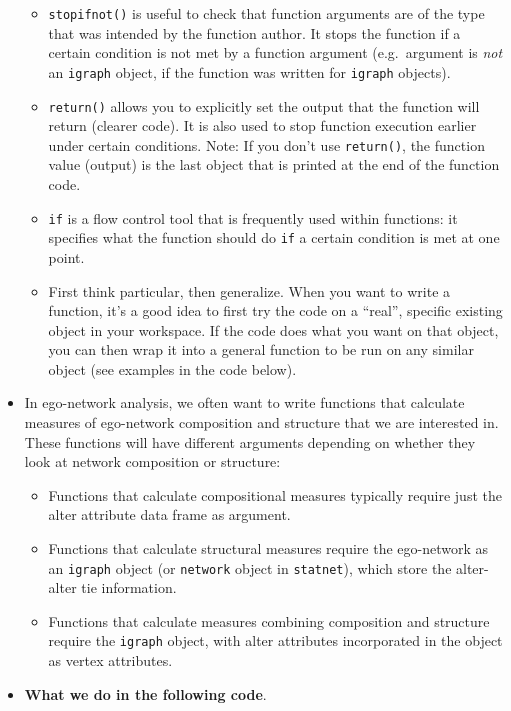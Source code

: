 \documentclass[
]{book}
\providecommand{\tightlist}{%
  \setlength{\itemsep}{0pt}\setlength{\parskip}{0pt}}
\begin{document}
\begin{itemize}
  \begin{itemize}
  \tightlist
  \item
    \texttt{stopifnot()} is useful to check that function arguments are of the type that was intended by the function author. It stops the function if a certain condition is not met by a function argument (e.g.~argument is \emph{not} an \texttt{igraph} object, if the function was written for \texttt{igraph} objects).
  \item
    \texttt{return()} allows you to explicitly set the output that the function will return (clearer code). It is also used to stop function execution earlier under certain conditions. Note: If you don't use \texttt{return()}, the function value (output) is the last object that is printed at the end of the function code.
  \item
    \texttt{if} is a flow control tool that is frequently used within functions: it specifies what the function should do \texttt{if} a certain condition is met at one point.
  \item
    First think particular, then generalize. When you want to write a function, it's a good idea to first try the code on a ``real'', specific existing object in your workspace. If the code does what you want on that object, you can then wrap it into a general function to be run on any similar object (see examples in the code below).
  \end{itemize}
\item
  In ego-network analysis, we often want to write functions that calculate measures of ego-network composition and structure that we are interested in. These functions will have different arguments depending on whether they look at network composition or structure:

  \begin{itemize}
  \tightlist
  \item
    Functions that calculate compositional measures typically require just the alter attribute data frame as argument.
  \item
    Functions that calculate structural measures require the ego-network as an \texttt{igraph} object (or \texttt{network} object in \texttt{statnet}), which store the alter-alter tie information.
  \item
    Functions that calculate measures combining composition and structure require the \texttt{igraph} object, with alter attributes incorporated in the object as vertex attributes.
  \end{itemize}
\item
  \textbf{What we do in the following code}.


\end{itemize}
\end{document}
